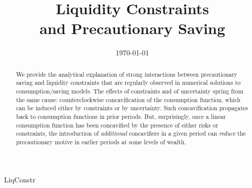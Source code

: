 \documentclass[titlepage]{\econtex}
\providecommand{\texname}{LiqConstr}%
\begin{document}


\hfill{\tiny \texname}

\title{Liquidity Constraints \\ and Precautionary Saving}

\newlength\TableWidth


\date{\today}
\maketitle




\hypertarget{Abstract}{}
\begin{abstract}
    We provide the analytical explanation of strong interactions between precautionary saving and liquidity constraints that are regularly observed in numerical solutions to consumption/saving models.  The effects of constraints and of uncertainty spring from the same cause: counterclockwise concavification of the consumption function, which can be induced either by constraints or by uncertainty.  Such concavification propagates back to consumption functions in prior periods.  But, surprisingly, once a linear consumption function has been concavified by the presence of either risks or constraints, the introduction of \textit{additional} concavifiers in a given period can \textit{reduce} the precautionary motive in earlier periods at some levels of wealth.  
\end{abstract}
\end{document}
